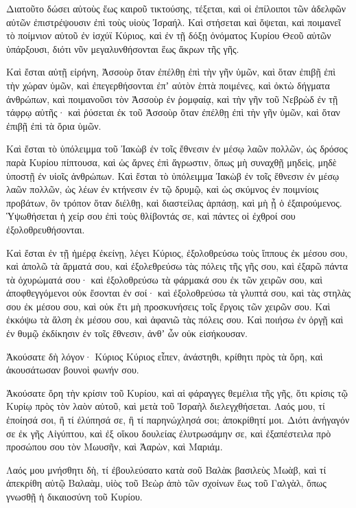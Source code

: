 \begin{spacing}{1.1}
\begin{multicols}{2}
Διατοῦτο δώσει αὐτοὺς ἕως καιροῦ τικτούσης, τέξεται, καὶ οἱ ἐπίλοιποι τῶν ἀδελφῶν αὐτῶν ἐπιστρέψουσιν ἐπὶ τοὺς υἱοὺς Ἰσραήλ.
Καὶ στήσεται καὶ ὄψεται, καὶ ποιμανεῖ τὸ ποίμνιον αὐτοῦ ἐν ἰσχύϊ Κύριος, καὶ ἐν τῇ δόξῃ ὀνόματος Κυρίου Θεοῦ αὐτῶν ὑπάρξουσι, διότι νῦν μεγαλυνθήσονται ἕως ἄκρων τῆς γῆς.

Καὶ ἔσται αὐτῇ εἰρήνη, Ἀσσοὺρ ὅταν ἐπέλθῃ ἐπὶ τὴν γῆν ὑμῶν, καὶ ὅταν ἐπιβῇ ἐπὶ τὴν χώραν ὑμῶν, καὶ ἐπεγερθήσονται ἐπʼ αὐτὸν ἑπτὰ ποιμένες, καὶ ὀκτὼ δήγματα ἀνθρώπων,
καὶ ποιμανοῦσι τὸν Ἀσσοὺρ ἐν ῥομφαίᾳ, καὶ τὴν γῆν τοῦ Νεβρὼδ ἐν τῇ τάφρῳ αὐτῆς· καὶ ῥύσεται ἐκ τοῦ Ἀσσοὺρ ὅταν ἐπέλθῃ ἐπὶ τὴν γῆν ὑμῶν, καὶ ὅταν ἐπιβῇ ἐπὶ τὰ ὅρια ὑμῶν.

Καὶ ἔσται τὸ ὑπόλειμμα τοῦ Ἰακὼβ ἐν τοῖς ἔθνεσιν ἐν μέσῳ λαῶν πολλῶν, ὡς δρόσος παρὰ Κυρίου πίπτουσα, καὶ ὡς ἄρνες ἐπὶ ἄγρωστιν, ὅπως μὴ συναχθῇ μηδεὶς, μηδὲ ὑποστῇ ἐν υἱοῖς ἀνθρώπων.
Καὶ ἔσται τὸ ὑπόλειμμα Ἰακὼβ ἐν τοῖς ἔθνεσιν ἐν μέσῳ λαῶν πολλῶν, ὡς λέων ἐν κτήνεσιν ἐν τῷ δρυμῷ, καὶ ὡς σκύμνος ἐν ποιμνίοις προβάτων, ὃν τρόπον ὅταν διέλθῃ, καὶ διαστείλας ἁρπάσῃ, καὶ μὴ ᾖ ὁ ἐξαιρούμενος.
Ὑψωθήσεται ἡ χείρ σου ἐπὶ τοὺς θλίβοντάς σε, καὶ πάντες οἱ ἐχθροί σου ἐξολοθρευθήσονται.

Καὶ ἔσται ἐν τῇ ἡμέρᾳ ἐκείνῃ, λέγει Κύριος, ἐξολοθρεύσω τοὺς ἵππους ἐκ μέσου σου, καὶ ἀπολῶ τὰ ἅρματά σου,
καὶ ἐξολεθρεύσω τὰς πόλεις τῆς γῆς σου, καὶ ἐξαρῶ πάντα τὰ ὀχυρώματά σου·
καὶ ἐξολοθρεύσω τὰ φάρμακά σου ἐκ τῶν χειρῶν σου, καὶ ἀποφθεγγόμενοι οὐκ ἔσονται ἐν σοί·
καὶ ἐξολοθρεύσω τὰ γλυπτά σου, καὶ τὰς στηλὰς σου ἐκ μέσου σου, καὶ οὐκ ἔτι μὴ προσκυνήσεις τοῖς ἔργοις τῶν χειρῶν σου.
Καὶ ἐκκόψω τὰ ἄλση ἐκ μέσου σου, καὶ ἀφανιῶ τὰς πόλεις σου.
Καὶ ποιήσω ἐν ὀργῇ καὶ ἐν θυμῷ ἐκδίκησιν ἐν τοῖς ἔθνεσιν, ἀνθʼ ὧν οὐκ εἰσήκουσαν.

Ἀκούσατε δὴ λόγον· Κύριος Κύριος εἶπεν, ἀνάστηθι, κρίθητι πρὸς τὰ ὄρη, καὶ ἀκουσάτωσαν βουνοὶ φωνήν σου.

Ἀκούσατε ὄρη τὴν κρίσιν τοῦ Κυρίου, καὶ αἱ φάραγγες θεμέλια τῆς γῆς, ὅτι κρίσις τῷ Κυρίῳ πρὸς τὸν λαὸν αὐτοῦ, καὶ μετὰ τοῦ Ἰσραὴλ διελεγχθήσεται.
Λαός μου, τί ἐποίησά σοι, ἢ τί ἐλύπησά σε, ἢ τί παρηνώχλησά σοι; ἀποκρίθητί μοι.
Διότι ἀνήγαγόν σε ἐκ γῆς Αἰγύπτου, καὶ ἐξ οἴκου δουλείας ἐλυτρωσάμην σε, καὶ ἐξαπέστειλα πρὸ προσώπου σου τὸν Μωυσῆν, καὶ Ἀαρὼν, καὶ Μαριάμ.

Λαός μου μνήσθητι δὴ, τί ἐβουλεύσατο κατὰ σοῦ Βαλὰκ βασιλεὺς Μωὰβ, καὶ τί ἀπεκρίθη αὐτῷ Βαλαὰμ, υἱὸς τοῦ Βεὼρ ἀπὸ τῶν σχοίνων ἕως τοῦ Γαλγὰλ, ὅπως γνωσθῇ ἡ δικαιοσύνη τοῦ Κυρίου.


\end{multicols}
\end{spacing}
